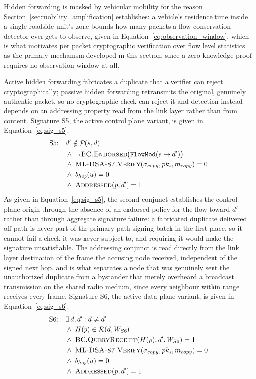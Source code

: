 \documentclass[final,5p,twocolumn]{elsarticle}
\theoremstyle{remark}
\theoremstyle{plain}
\begin{document}
Hidden forwarding is masked by vehicular mobility for the reason
Section~\ref{sec:mobility_amplification} establishes: a vehicle's
residence time inside a single roadside unit's zone bounds how many
packets a flow conservation detector ever gets to observe, given in
Equation~\eqref{eq:observation_window}, which is what motivates per
packet cryptographic verification over flow level statistics as the
primary mechanism developed in this section, since a zero knowledge
proof requires no observation window at all.

Active hidden forwarding fabricates a duplicate that a verifier can reject
cryptographically; passive hidden forwarding retransmits the original,
genuinely authentic packet, so no cryptographic check can reject it and
detection instead depends on an addressing property read from the link
layer rather than from content. Signature S5, the active control plane
variant, is given in Equation~\eqref{eq:sig_s5}.
\begin{equation}
	\begin{aligned}
		\text{S5:}\quad
		& d' \notin \mathcal{P}(s,d) \\
		& \wedge\; \neg\,\textsc{BC.Endorsed}\big(\texttt{FlowMod}(s \to d')\big) \\
		& \wedge\; \textsc{ML-DSA-87.Verify}(\sigma_{copy}, pk_s, m_{copy}) = 0 \\
		& \wedge\; b_{hop}(u) = 0 \\
		& \wedge\; \textsc{Addressed}(p, d') = 1
	\end{aligned}
	\label{eq:sig_s5}
\end{equation}
As given in Equation~\eqref{eq:sig_s5}, the second conjunct establishes the
control plane origin through the absence of an endorsed policy for the flow
toward $d'$ rather than through aggregate signature failure: a fabricated
duplicate delivered off path is never part of the primary path signing
batch in the first place, so it cannot fail a check it was never subject to,
and requiring it would make the signature unsatisfiable. The addressing
conjunct is read directly from the link layer destination of the frame the
accusing node received, independent of the signed next hop, and is what
separates a node that was genuinely sent the unauthorized duplicate from a
bystander that merely overheard a broadcast transmission on the shared
radio medium, since every neighbour within range receives every frame.
Signature S6, the active data plane variant, is given in
Equation~\eqref{eq:sig_s6}.
\begin{equation}
	\begin{aligned}
		\text{S6:}\quad
		& \exists\, d, d' : d \neq d' \\
		& \wedge\; H(p) \in \mathcal{R}(d, W_{S6}) \\
		& \wedge\; \textsc{BC.QueryReceipt}(H(p), d', W_{S6}) = 1 \\
		& \wedge\; \textsc{ML-DSA-87.Verify}(\sigma_{copy}, pk_s, m_{copy}) = 0 \\
		& \wedge\; b_{hop}(u) = 0 \\
		& \wedge\; \textsc{Addressed}(p, d') = 1
	\end{aligned}
	\label{eq:sig_s6}
\end{equation}
\end{document}

